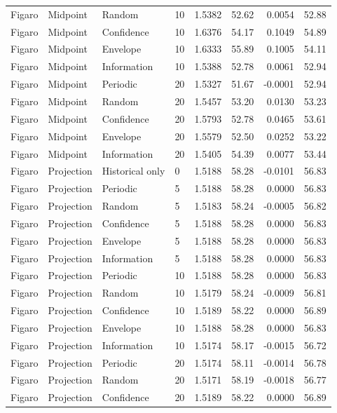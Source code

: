 \begin{longtable}{llllrrrr}
Figaro & Midpoint & Random & 10 & 1.5382 & 52.62 & 0.0054 & 52.88 \\
Figaro & Midpoint & Confidence & 10 & 1.6376 & 54.17 & 0.1049 & 54.89 \\
Figaro & Midpoint & Envelope & 10 & 1.6333 & 55.89 & 0.1005 & 54.11 \\
Figaro & Midpoint & Information & 10 & 1.5388 & 52.78 & 0.0061 & 52.94 \\
Figaro & Midpoint & Periodic & 20 & 1.5327 & 51.67 & -0.0001 & 52.94 \\
Figaro & Midpoint & Random & 20 & 1.5457 & 53.20 & 0.0130 & 53.23 \\
Figaro & Midpoint & Confidence & 20 & 1.5793 & 52.78 & 0.0465 & 53.61 \\
Figaro & Midpoint & Envelope & 20 & 1.5579 & 52.50 & 0.0252 & 53.22 \\
Figaro & Midpoint & Information & 20 & 1.5405 & 54.39 & 0.0077 & 53.44 \\
Figaro & Projection & Historical only & 0 & 1.5188 & 58.28 & -0.0101 & 56.83 \\
Figaro & Projection & Periodic & 5 & 1.5188 & 58.28 & 0.0000 & 56.83 \\
Figaro & Projection & Random & 5 & 1.5183 & 58.24 & -0.0005 & 56.82 \\
Figaro & Projection & Confidence & 5 & 1.5188 & 58.28 & 0.0000 & 56.83 \\
Figaro & Projection & Envelope & 5 & 1.5188 & 58.28 & 0.0000 & 56.83 \\
Figaro & Projection & Information & 5 & 1.5188 & 58.28 & 0.0000 & 56.83 \\
Figaro & Projection & Periodic & 10 & 1.5188 & 58.28 & 0.0000 & 56.83 \\
Figaro & Projection & Random & 10 & 1.5179 & 58.24 & -0.0009 & 56.81 \\
Figaro & Projection & Confidence & 10 & 1.5189 & 58.22 & 0.0000 & 56.89 \\
Figaro & Projection & Envelope & 10 & 1.5188 & 58.28 & 0.0000 & 56.83 \\
Figaro & Projection & Information & 10 & 1.5174 & 58.17 & -0.0015 & 56.72 \\
Figaro & Projection & Periodic & 20 & 1.5174 & 58.11 & -0.0014 & 56.78 \\
Figaro & Projection & Random & 20 & 1.5171 & 58.19 & -0.0018 & 56.77 \\
Figaro & Projection & Confidence & 20 & 1.5189 & 58.22 & 0.0000 & 56.89 \\

\end{longtable}
